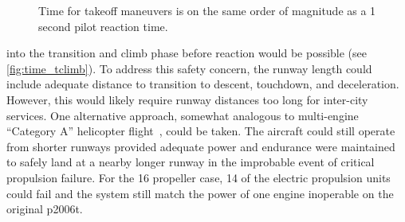 \documentclass[conf]{new-aiaa}
\begin{document}
\begin{figure}[H]
    \centering
    \qquad
    \caption{Time for takeoff maneuvers is on the same order of magnitude as a 1 second pilot reaction time.}
    \label{f:time}
\end{figure}

\noindent  into the transition and climb phase before reaction would be possible (see \cref{fig:time_tclimb}). To address this safety concern, the runway length could include adequate distance to transition to descent, touchdown, and deceleration.  However, this would likely require runway distances too long for inter-city services. One alternative approach, somewhat analogous to multi-engine ``Category A'' helicopter flight~\cite{LUNAAS199115}, could be taken. The aircraft could still operate from shorter runways provided adequate power and endurance were maintained to safely land at a nearby longer runway in the improbable event of critical propulsion failure. For the 16 propeller case, 14 of the electric propulsion units could fail and the system still match the power of one engine inoperable on the original p2006t.
\end{document}
